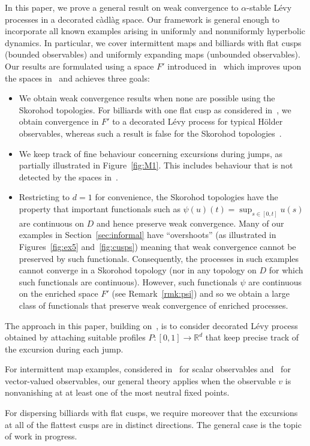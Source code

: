 \documentclass[12pt]{article}
\numberwithin{equation}{section}
\newcommand{\R}{{\mathbb R}}
\begin{document}
In this paper, we prove a general result on weak convergence to $\alpha$-stable L\'evy processes in a decorated 
c\`adl\`ag space. Our framework is general enough to incorporate all known examples arising in uniformly and nonuniformly hyperbolic dynamics. In particular, we cover intermittent maps and billiards with flat cusps (bounded observables) and uniformly expanding maps (unbounded observables). Our results are formulated using a space $F'$ introduced in~\cite{Freitas2Toddsub} which improves upon the spaces in~\cite{Whitt} and achieves three 
goals: 
\begin{itemize}
\item[(i)] We obtain weak convergence results when none are possible using the Skorohod topologies. For billiards with one flat cusp as considered in~\cite{MV20}, we obtain convergence in $F'$ to a decorated L\'evy process for typical H\"older observables, whereas such a result is false for the Skorohod topologies~\cite{JMPVZ21}. 
\item[(ii)] We keep track of fine behaviour concerning excursions during jumps, as partially illustrated in Figure~\ref{fig:M1}. This includes behaviour that is not detected by the spaces in~\cite{Whitt}.
\item[(iii)] Restricting to $d=1$ for convenience, the Skorohod topologies have the property that important functionals such as $\psi(u)(t)=\sup_{s\in[0,t]}u(s)$ are continuous on $D$ and hence preserve weak convergence. Many of our examples in Section~\ref{sec:informal} have ``overshoots'' (as illustrated in Figures~\ref{fig:ex5} and~\ref{fig:cusps}) meaning that weak convergence cannot be preserved by such functionals. Consequently, the processes in such examples cannot converge in a Skorohod topology (nor in any topology on $D$ for which such functionals are continuous).  However, such functionals $\psi$ are continuous on the enriched space $F'$ (see Remark~\ref{rmk:psi}) and so we obtain a large class of functionals that preserve weak convergence of enriched processes.
\end{itemize}

The approach in this paper, building on~\cite{Freitas2Toddsub}, is to consider decorated L\'evy process obtained by attaching suitable profiles $P:[0,1]\to\R^d$ that keep precise track of the excursion during each jump.

\begin{rmk}
For intermittent map examples, considered in~\cite{MZ15} for scalar observables and~\cite{CFKM20} for vector-valued observables, our general theory applies when the observable $v$ is nonvanishing at at least one of the most neutral fixed points. 

For dispersing billiards with flat cusps, we require moreover that  the excursions at all of the flattest cusps are in distinct directions. The general case is the topic of work in progress.
\end{rmk}
\end{document}
